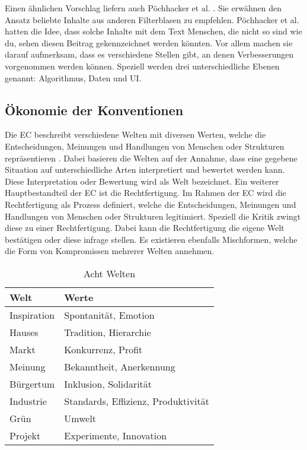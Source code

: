 Einen ähnlichen Vorschlag liefern auch Pöchhacker et al. \cite{rundfunk}.
Sie erwähnen den Ansatz beliebte Inhalte aus anderen Filterblasen zu empfehlen.
Pöchhacker et al. hatten die Idee, dass solche Inhalte mit dem Text \glqq Menschen, die nicht so sind wie du, sehen diesen Beitrag\grqq{} gekennzeichnet werden könnten.
Vor allem machen sie darauf aufmerksam, dass es verschiedene Stellen gibt, an denen Verbesserungen vorgenommen werden können.
Speziell werden drei unterschiedliche Ebenen genannt: Algorithmus, Daten und UI.

\subsection{Ökonomie der Konventionen}
Die \ac{EC} beschreibt verschiedene \glqq Welten\grqq{} mit diversen Werten, welche die Entscheidungen, Meinungen und Handlungen von Menschen oder Strukturen repräsentieren \cite{on-justification, oekonomie-konventionen}.
Dabei basieren die Welten auf der Annahme, dass eine gegebene Situation auf unterschiedliche Arten interpretiert und bewertet werden kann.
Diese Interpretation oder Bewertung wird als Welt bezeichnet.
Ein weiterer Hauptbestandteil der \ac{EC} ist die Rechtfertigung.
Im Rahmen der \ac{EC} wird die Rechtfertigung als Prozess definiert, welche die Entscheidungen, Meinungen und Handlungen von Menschen oder Strukturen legitimiert.
Speziell die Kritik zwingt diese zu einer Rechtfertigung.
Dabei kann die Rechtfertigung die eigene Welt bestätigen oder diese infrage stellen.
Es existieren ebenfalls Mischformen, welche die Form von Kompromissen mehrerer Welten annehmen.
\begin{center}
    \begin{table}[!ht]
        \centering
        \begin{tabular}{|l l|}
            \hline
            Welt        & Werte                               \\ \hline
            Inspiration & Spontanität, Emotion                \\
            Hauses      & Tradition, Hierarchie               \\
            Markt       & Konkurrenz, Profit                  \\
            Meinung     & Bekanntheit, Anerkennung            \\
            Bürgertum   & Inklusion, Solidarität              \\
            Industrie   & Standards, Effizienz, Produktivität \\ \hline \hline
            Grün        & Umwelt                              \\
            Projekt     & Experimente, Innovation             \\ \hline
        \end{tabular}
        \caption{Acht Welten}
        \label{table:eight-worlds}
    \end{table}
\end{center}

